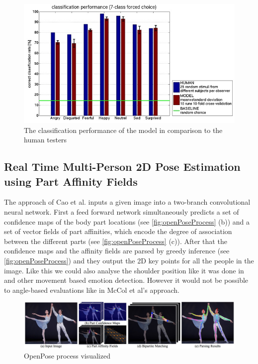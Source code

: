 \documentclass[conference]{IEEEtran}
\begin{document}
\begin{figure}[H]
\centering
\includegraphics[width=\linewidth]{biologicallyInspiredNeuralModelEval.jpg}
\caption{The classification performance of the model in comparison to the human testers\cite{schindler2008recognizing}}
\label{fig:biologicallyInspiredNeuralModelEval}
\end{figure}





\subsection{Real Time Multi-Person 2D Pose Estimation using Part Affinity Fields}
The approach of Cao et al.\cite{cao2017realtime} inputs a given image into a two-branch convolutional neural network. First a feed forward network simultaneously predicts a set of confidence maps of the body part locations (see \autoref{fig:openPoseProcess} (b)) and a set of vector fields of part affinities, which encode the degree of association between the different parts (see \autoref{fig:openPoseProcess} (c))\cite{cao2017realtime}. After that the confidence maps and the affinity fields are parsed by greedy inference (see \autoref{fig:openPoseProcess}) and they output the 2D key points for all the people in the image\cite{cao2017realtime}.
Like this we could also analyse the shoulder position like it was done in \cite{barathi2016lie} and other movement based emotion detection. However it would not be possible to angle-based evaluations like in McCol et al's approach\cite{mccoll2012affect}. 

\begin{figure}[H]
\centering
\includegraphics[width=\linewidth]{openPoseProcess.jpg}
\caption{OpenPose process visualized\cite{cao2017realtime}}
\label{fig:openPoseProcess}
\end{figure}
\end{document}
